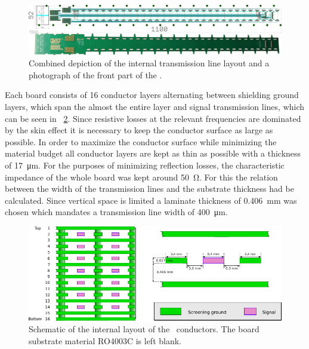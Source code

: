 \documentclass[../BTOF_summary.tex]{subfiles}
\begin{document}
\begin{figure}[htbp]
	\centering
	\includegraphics*[width=.9\textwidth]{fig/Railboard3_imageCombined.png}
	\caption{Combined depiction of the internal transmission line layout and a photograph of the front part of the \railboard .}
	\label{fig:Railboard}
\end{figure}

Each board consists of 16 conductor layers alternating between shielding ground layers, which span the almost the entire layer and signal transmission lines, which can be seen in \fig ~\ref{fig:Railboard3_schematic}.
Since resistive losses at the relevant frequencies are dominated by the skin effect it is necessary to keep the conductor surface as large as possible.
In order to maximize the conductor surface while minimizing the material budget all conductor layers are kept as thin as possible with a thickness of \SI{17}{\micro \meter}.
For the purposes of minimizing reflection losses, the characteristic impedance of the whole board was kept around \SI{50}{\ohm}.
For this the relation between the width of the transmission lines and the substrate thickness had be calculated.
Since vertical space is limited a laminate thickness of \SI{0.406}{mm} was chosen which mandates a transmission line width of \SI{400}{\micro m}.

\begin{figure}[htbp]
	\centering
	\includegraphics[width=.9\textwidth]{fig/Railboard3_schematic.pdf}
	\caption{Schematic of the internal layout of the \railboard\ conductors. The board substrate material RO4003C is left blank.}
	\label{fig:Railboard3_schematic}
\end{figure}
\end{document}
